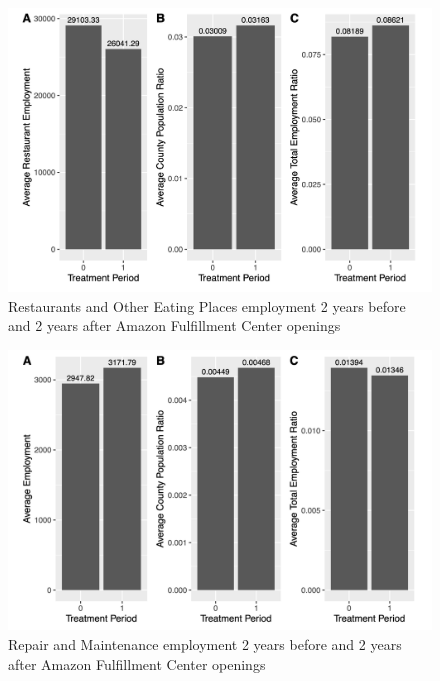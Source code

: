 \documentclass[11pt]{article}
\begin{document}
\begin{figure}[H]
\centering
\includegraphics[width=15cm]{REST.png}
\caption{Restaurants and Other Eating Places employment 2 years before and 2 years after Amazon Fulfillment Center openings}
\end{figure}

\begin{figure}[H]
\centering
\includegraphics[width=15cm]{REPMT.png}
\caption{Repair and Maintenance employment 2 years before and 2 years after Amazon Fulfillment Center openings}
\end{figure}
\end{document}

